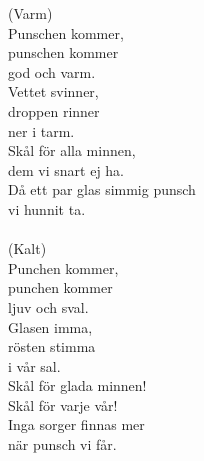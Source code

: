 
            (Varm) \\
            Punschen kommer, \\
            punschen kommer \\
            god och varm. \\
            Vettet svinner, \\
            droppen rinner \\
            ner i tarm. \\
            Skål för alla minnen, \\
            dem vi snart ej ha. \\
            Då ett par glas simmig punsch \\
            vi hunnit ta. \\
\hspace{10mm} \\
            (Kalt) \\
            Punchen kommer, \\
            punchen kommer \\
            ljuv och sval. \\
            Glasen imma, \\
            rösten stimma \\
            i vår sal. \\
            Skål för glada minnen! \\
            Skål för varje vår! \\
            Inga sorger finnas mer \\
            när punsch vi får. \\

